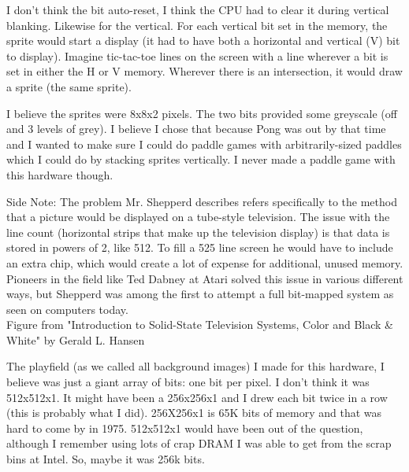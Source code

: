 I don't think the bit auto-reset, I think the CPU had to clear it during vertical blanking. Likewise for the vertical. For each vertical bit set in the memory, the sprite would start a display (it had to have both a horizontal and vertical (V) bit to display). Imagine tic-tac-toe lines on the screen with a line wherever a bit is set in either the H or V memory. Wherever there is an intersection, it would draw a sprite (the same sprite).

I believe the sprites were 8x8x2 pixels. The two bits provided some greyscale (off and 3 levels of grey). I believe I chose that because Pong was out by that time and I wanted to make sure I could do paddle games with arbitrarily-sized paddles which I could do by stacking sprites vertically. I never made a paddle game with this hardware though. 

\begin{tcolorbox}[]
        {
        Side Note: The problem Mr. Shepperd describes refers specifically to the method that a picture would be displayed on a tube-style television. The issue with the line count (horizontal strips that make up the television display) is that data is stored in powers of 2, like 512. To fill a 525 line screen he would have to include an extra chip, which would create a lot of expense for additional, unused memory. Pioneers in the field like Ted Dabney at Atari solved this issue in various different ways, but Shepperd was among the first to attempt a full bit-mapped system as seen on computers today.\\ Figure from "Introduction to Solid-State Television Systems, Color and Black \& White" by Gerald L. Hansen}
\end{tcolorbox} 

The playfield (as we called all background images) I made for this hardware, I believe was just a giant array of bits: one bit per pixel. I don't think it was 512x512x1. It might have been a 256x256x1 and I drew each bit twice in a row (this is probably what I did). 256X256x1 is 65K bits of memory and that was hard to come by in 1975. 512x512x1 would have been out of the question, although I remember using lots of crap DRAM I was able to get from the scrap bins at Intel. So, maybe it was 256k bits. 

